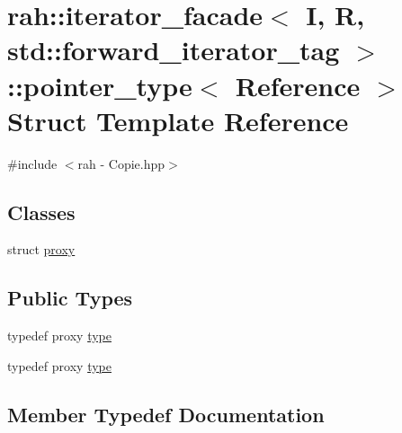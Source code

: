 \hypertarget{structrah_1_1iterator__facade_3_01_i_00_01_r_00_01std_1_1forward__iterator__tag_01_4_1_1pointer__type}{}\section{rah\+::iterator\+\_\+facade$<$ I, R, std\+::forward\+\_\+iterator\+\_\+tag $>$\+::pointer\+\_\+type$<$ Reference $>$ Struct Template Reference}
\label{structrah_1_1iterator__facade_3_01_i_00_01_r_00_01std_1_1forward__iterator__tag_01_4_1_1pointer__type}


{\ttfamily \#include $<$rah -\/ Copie.\+hpp$>$}

\subsection*{Classes}
\begin{DoxyCompactItemize}
\item 
struct \mbox{\hyperlink{structrah_1_1iterator__facade_3_01_i_00_01_r_00_01std_1_1forward__iterator__tag_01_4_1_1pointer__type_1_1proxy}{proxy}}
\end{DoxyCompactItemize}
\subsection*{Public Types}
\begin{DoxyCompactItemize}
\item 
typedef proxy \mbox{\hyperlink{structrah_1_1iterator__facade_3_01_i_00_01_r_00_01std_1_1forward__iterator__tag_01_4_1_1pointer__type_a2289999abe125951a510673b21746a0d}{type}}
\item 
typedef proxy \mbox{\hyperlink{structrah_1_1iterator__facade_3_01_i_00_01_r_00_01std_1_1forward__iterator__tag_01_4_1_1pointer__type_a2289999abe125951a510673b21746a0d}{type}}
\end{DoxyCompactItemize}


\subsection{Member Typedef Documentation}
\mbox{\label{structrah_1_1iterator__facade_3_01_i_00_01_r_00_01std_1_1forward__iterator__tag_01_4_1_1pointer__type_a2289999abe125951a510673b21746a0d}} 
